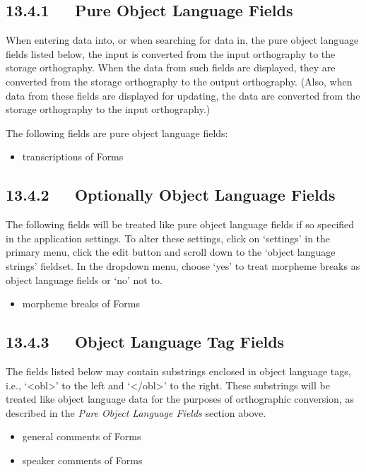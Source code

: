 \documentclass[letterpaper,10pt,english]{sphinxmanual}
\begin{document}
\subsection{13.4.1   Pure Object Language Fields}
\label{user_guide:pure-object-language-fields}
When entering data into, or when searching for data in, the pure object language
fields listed below, the input is converted from the input orthography to the
storage orthography.  When the data from such fields are displayed, they are
converted from the storage orthography to the output orthography.  (Also, when
data from these fields are displayed for updating, the data are converted from
the storage orthography to the input orthography.)

The following fields are pure object language fields:
\begin{itemize}
\item {} 
transcriptions of Forms

\end{itemize}


\subsection{13.4.2   Optionally Object Language Fields}
\label{user_guide:optionally-object-language-fields}
The following fields will be treated like pure object language fields if so
specified in the application settings.  To alter these settings, click on
`settings' in the primary menu, click the edit button and scroll down to the
`object language strings' fieldset.  In the dropdown menu, choose `yes' to treat
morpheme breaks as object language fields or `no' not to.
\begin{itemize}
\item {} 
morpheme breaks of Forms

\end{itemize}


\subsection{13.4.3   Object Language Tag Fields}
\label{user_guide:object-language-tag-fields}
The fields listed below may contain substrings enclosed in object language tags,
i.e., `\textless{}obl\textgreater{}' to the left and `\textless{}/obl\textgreater{}' to the right.  These substrings will be
treated like object language data for the purposes of orthographic conversion,
as described in the \emph{Pure Object Language Fields} section above.
\begin{itemize}
\item {} 
general comments of Forms

\item {} 
speaker comments of Forms

\end{itemize}
\end{document}
